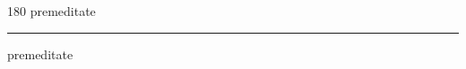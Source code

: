 
\begin{frame}
\begin{center}
\begin{turn}{180}
{\fontsize{2.5cm}{1em}\selectfont premeditate}
\end{turn}
\vspace{1em}\par  
\hrule
\vspace{1em}\par  
{\fontsize{2.5cm}{1em}\selectfont premeditate}
\end{center}
\end{frame}
